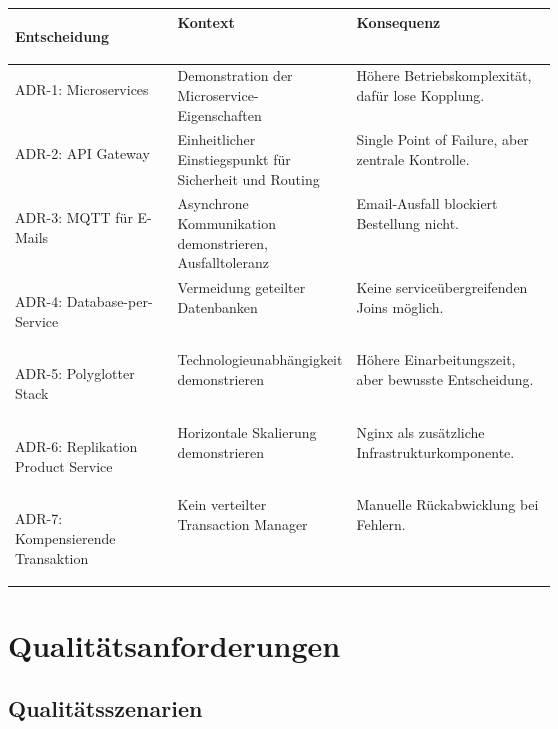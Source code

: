 \documentclass[11pt,a4paper]{article}
\newcommand{\tabellenkopf}{%
  \renewcommand{\arraystretch}{1.4}%
  \rowcolors{2}{tableRowColor}{white}%
}
\begin{document}
\begin{center}
\tabellenkopf
\begin{tabularx}{\linewidth}{
        >{\bfseries\raggedright\arraybackslash}p{0.3\linewidth}
        >{\raggedright\arraybackslash}p{0.33\linewidth}
        >{\raggedright\arraybackslash}X}
    \toprule
    \rowcolor{tableHeaderColor}
    Entscheidung & Kontext & Konsequenz \\
    \midrule
    ADR-1: Microservices &
    Demonstration der Microservice-Eigenschaften &
    H\"ohere Betriebskomplexit\"at, daf\"ur lose Kopplung. \\
    ADR-2: API Gateway &
    Einheitlicher Einstiegspunkt f\"ur Sicherheit und Routing &
    Single Point of Failure, aber zentrale Kontrolle. \\
    ADR-3: MQTT f\"ur E-Mails &
    Asynchrone Kommunikation demonstrieren, Ausfalltoleranz &
    Email-Ausfall blockiert Bestellung nicht. \\
    ADR-4: Database-per-Service &
    Vermeidung geteilter Datenbanken &
    Keine service\"ubergreifenden Joins m\"oglich. \\
    ADR-5: Polyglotter Stack &
    Technologieunabh\"angigkeit demonstrieren &
    H\"ohere Einarbeitungszeit, aber bewusste Entscheidung. \\
    ADR-6: Replikation Product Service &
    Horizontale Skalierung demonstrieren &
    Nginx als zus\"atzliche Infrastrukturkomponente. \\
    ADR-7: Kompensierende Transaktion &
    Kein verteilter Transaction Manager &
    Manuelle R\"uckabwicklung bei Fehlern. \\
    \bottomrule
\end{tabularx}
\end{center}

\section{Qualit\"atsanforderungen}

\subsection{Qualit\"atsszenarien}
\end{document}
